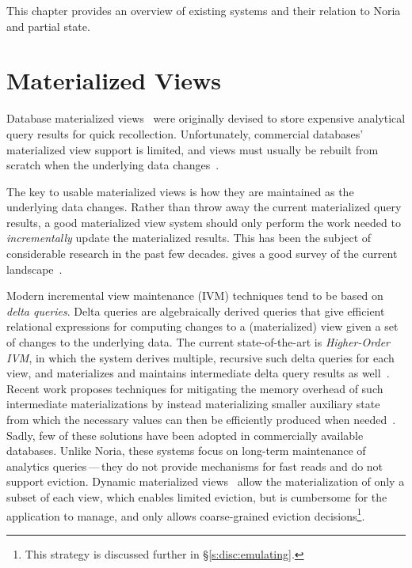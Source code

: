 This chapter provides an overview of existing systems and their relation to
Noria and partial state.

\section{Materialized Views}

Database materialized views~\cite{materialized-views} were originally devised to
store expensive analytical query results for quick recollection. Unfortunately,
commercial databases' materialized view support is limited, and views must
usually be rebuilt from scratch when the underlying data
changes~\cite{materialized-view-selection-sql-server,
mssql-materialized-view-restrictions-blog,
mssql-materialized-view-restrictions}.

The key to usable materialized views is how they are maintained as the
underlying data changes. Rather than throw away the current materialized query
results, a good materialized view system should only perform the work needed to
\textit{incrementally} update the materialized results. This has been the
subject of considerable research in the past few decades.
\citeauthor{materialized-survey} gives a good survey of the current
landscape~\cite{materialized-survey}.

Modern incremental view maintenance (IVM) techniques tend to be based on
\textit{delta queries}. Delta queries are algebraically derived queries that
give efficient relational expressions for computing changes to a (materialized)
view given a set of changes to the underlying data. The current state-of-the-art
is \textit{Higher-Order IVM}, in which the system derives multiple, recursive
such delta queries for each view, and materializes and maintains intermediate
delta query results as well~\cite{dbtoaster, hotdog}. Recent work proposes
techniques for mitigating the memory overhead of such intermediate
materializations by instead materializing smaller auxiliary state from which the
necessary values can then be efficiently produced when
needed~\cite{memory-efficient}. Sadly, few of these solutions have been adopted
in commercially available databases. Unlike Noria, these systems focus on
long-term maintenance of analytics queries\,---\,they do not provide mechanisms
for fast reads and do not support eviction. Dynamic materialized
views~\cite{dynamic-materialized-views, partially-materialized-views} allow the
materialization of only a subset of each view, which enables limited eviction,
but is cumbersome for the application to manage, and only allows coarse-grained
eviction decisions\footnote{This strategy is discussed further in
\S\ref{s:disc:emulating}.}.

